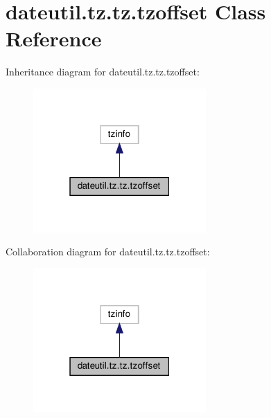 \hypertarget{classdateutil_1_1tz_1_1tz_1_1tzoffset}{}\section{dateutil.\+tz.\+tz.\+tzoffset Class Reference}
\label{classdateutil_1_1tz_1_1tz_1_1tzoffset}


Inheritance diagram for dateutil.\+tz.\+tz.\+tzoffset\+:
\nopagebreak
\begin{figure}[H]
\begin{center}
\leavevmode
\includegraphics[width=187pt]{classdateutil_1_1tz_1_1tz_1_1tzoffset__inherit__graph}
\end{center}
\end{figure}


Collaboration diagram for dateutil.\+tz.\+tz.\+tzoffset\+:
\nopagebreak
\begin{figure}[H]
\begin{center}
\leavevmode
\includegraphics[width=187pt]{classdateutil_1_1tz_1_1tz_1_1tzoffset__coll__graph}
\end{center}
\end{figure}
